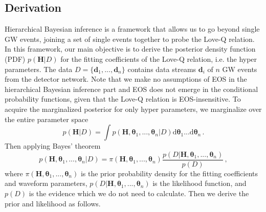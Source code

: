 \documentclass[a4paper,11pt]{article}
\begin{document}
\subsection{Derivation}
\label{sec2_2}

Hierarchical Bayesian inference is a framework that allows us to go beyond single GW events, joining a set 
of single events together to probe the Love-Q relation. In this framework, our main objective is to derive 
the posterior density function (PDF) $p(\bm{H}|D)$ for the fitting coefficients of the Love-Q relation, 
i.e. the hyper parameters. The data $D=\{\bm{d}_1,...,\bm{d}_n\}$ contains data streams $\bm{d}_i$ of $n$ 
GW events from the detector network. Note that we make no assumptions of EOS in the hierarchical Bayesian 
inference part and EOS does not emerge in the conditional probability functions, given that the Love-Q relation 
is EOS-insensitive. To acquire the marginalized posterior for only hyper parameters, we marginalize over the entire parameter space
\begin{equation}
\label{bayes1}
p(\bm{H}|D) = \int p(\bm{H},\bm{\theta}_1,...,\bm{\theta}_n|D) \text{d}\bm{\theta}_1...\text{d}\bm{\theta}_n\,.
\end{equation}
Then applying Bayes' theorem
\begin{equation}
\label{bayes2}
p(\bm{H},\bm{\theta}_1,...,\bm{\theta}_n|D)=\pi(\bm{H},\bm{\theta}_1,...,\bm{\theta}_n)\frac{p(D|\bm{H},\bm{\theta}_1,...,\bm{\theta}_n)}{p(D)}\,,
\end{equation}
where $\pi(\bm{H},\bm{\theta}_1,...,\bm{\theta}_n)$ is the prior probability density for the fitting coefficients 
and waveform parameters, $p(D|\bm{H},\bm{\theta}_1,...,\bm{\theta}_n)$ is the likelihood function, and $p(D)$ is 
the evidence which we do not need to calculate. Then we derive the prior and likelihood as follows.
\end{document}
